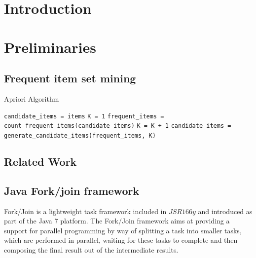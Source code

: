 \documentclass[conference]{IEEEtran}
\begin{document}




%
\IEEEpeerreviewmaketitle



\section{Introduction}

\section{Preliminaries}

\subsection{Frequent item set mining}

\begin{algorithm}\caption{Apriori Algorithm}\label{alg:apriori}
  \begin{algorithmic}[1]
	\STATE \texttt{candidate\_items = items}
	\STATE \texttt{K = 1}
	    \STATE \texttt{frequent\_items = count\_frequent\_items(candidate\_items)}
			\STATE \texttt{K = K + 1}
	    \STATE \texttt {candidate\_items = generate\_candidate\_items(frequent\_items, K)}
    \ENDWHILE
  \end{algorithmic}
\end{algorithm}



\subsection{Related Work}

\subsection{Java Fork/join framework}
Fork/Join is a lightweight task framework included in $JSR166y$ and introduced as part of the Java 7 platform. The Fork/Join framework aims at providing a support for parallel programming by way of splitting a task into smaller tasks, which are performed in parallel, waiting for these tasks to complete and then composing the final result out of the intermediate results.
\end{document}

